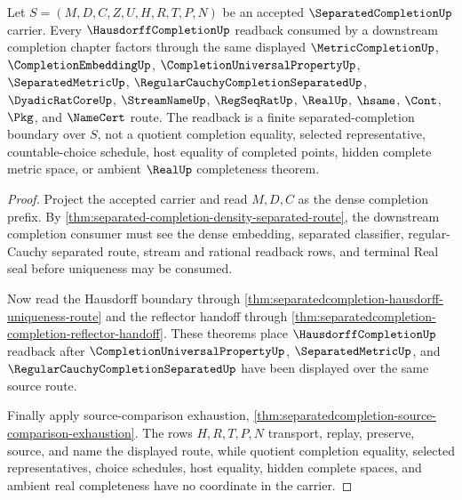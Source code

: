 \begin{theorem}
\label{thm:separated-completion-hausdorff-completion-readback}
Let $S=(M,D,C,Z,U,H,R,T,P,N)$ be an accepted $\SeparatedCompletionUp$ carrier. Every $\HausdorffCompletionUp$ readback consumed by a downstream completion chapter factors through the same displayed $\MetricCompletionUp$, $\CompletionEmbeddingUp$, $\CompletionUniversalPropertyUp$, $\SeparatedMetricUp$, $\RegularCauchyCompletionSeparatedUp$, $\DyadicRatCoreUp$, $\StreamNameUp$, $\RegSeqRatUp$, $\RealUp$, $\hsame$, $\Cont$, $\Pkg$, and $\NameCert$ route. The readback is a finite separated-completion boundary over $S$, not a quotient completion equality, selected representative, countable-choice schedule, host equality of completed points, hidden complete metric space, or ambient $\RealUp$ completeness theorem.
\end{theorem}
\begin{proof}
Project the accepted carrier and read $M,D,C$ as the dense completion prefix. By \autoref{thm:separated-completion-density-separated-route}, the downstream completion consumer must see the dense embedding, separated classifier, regular-Cauchy separated route, stream and rational readback rows, and terminal Real seal before uniqueness may be consumed.

Now read the Hausdorff boundary through \autoref{thm:separatedcompletion-hausdorff-uniqueness-route} and the reflector handoff through \autoref{thm:separatedcompletion-completion-reflector-handoff}. These theorems place $\HausdorffCompletionUp$ readback after $\CompletionUniversalPropertyUp$, $\SeparatedMetricUp$, and $\RegularCauchyCompletionSeparatedUp$ have been displayed over the same source route.

Finally apply source-comparison exhaustion, \autoref{thm:separatedcompletion-source-comparison-exhaustion}. The rows $H,R,T,P,N$ transport, replay, preserve, source, and name the displayed route, while quotient completion equality, selected representatives, choice schedules, host equality, hidden complete spaces, and ambient real completeness have no coordinate in the carrier.
\end{proof}

